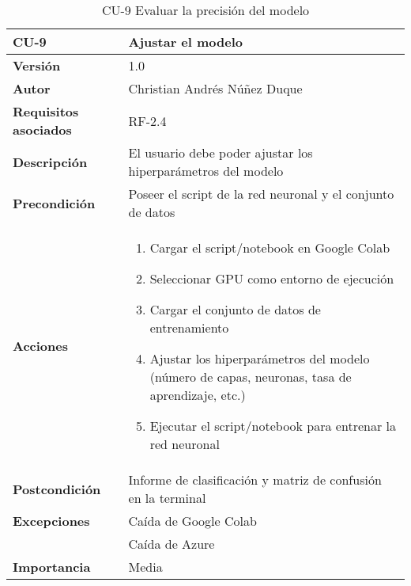 \begin{table}[p]
	\centering
	\begin{tabularx}{\linewidth}{ p{} p{} }
		\toprule
		\textbf{CU-9}    & \textbf{Ajustar el modelo}\\
		\toprule
		\textbf{Versión}              & 1.0    \\
		\textbf{Autor}                & Christian Andrés Núñez Duque \\
		\textbf{Requisitos asociados} & RF-2.4 \\
		\textbf{Descripción}          & El usuario debe poder ajustar los hiperparámetros del modelo \\
		\textbf{Precondición}         & Poseer el script de la red neuronal y el conjunto de datos \\
		\textbf{Acciones}             &
		\begin{enumerate}
			\def\labelenumi{\arabic{enumi}.}
			\tightlist
			\item Cargar el script/notebook en Google Colab
			\item Seleccionar GPU como entorno de ejecución
			\item Cargar el conjunto de datos de entrenamiento
			\item Ajustar los hiperparámetros del modelo (número de capas, neuronas, tasa de aprendizaje, etc.)
			\item Ejecutar el script/notebook para entrenar la red neuronal
		\end{enumerate}\\
		\textbf{Postcondición}        & Informe de clasificación y matriz de confusión en la terminal \\
		\textbf{Excepciones}          & Caída de Google Colab \\ & Caída de Azure \\
		\textbf{Importancia}          & Media \\
		\bottomrule
	\end{tabularx}
	\caption{CU-9 Evaluar la precisión del modelo}
\end{table}

